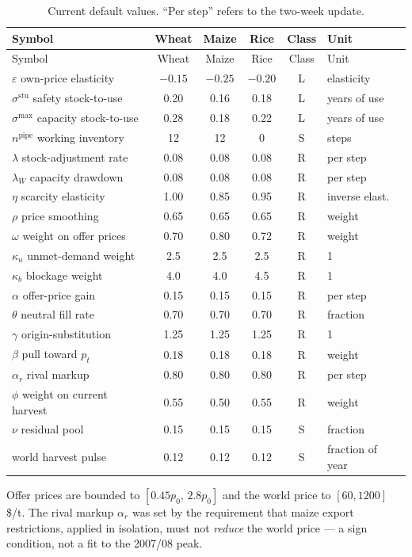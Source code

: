 \begin{longtable}{lccccl}
\caption{Current default values. ``Per step'' refers to the two-week
update.}
\label{tab:params}\\
\toprule
Symbol & Wheat & Maize & Rice & Class & Unit \\
\midrule
\endfirsthead
\toprule
Symbol & Wheat & Maize & Rice & Class & Unit \\
\midrule
\endhead
\(\varepsilon\) own-price elasticity & \(-0.15\) & \(-0.25\) & \(-0.20\) & L & elasticity \\
\(\sigma^{\mathrm{stu}}\) safety stock-to-use & 0.20 & 0.16 & 0.18 & L & years of use \\
\(\sigma^{\max}\) capacity stock-to-use & 0.28 & 0.18 & 0.22 & L & years of use \\
\(n^{\mathrm{pipe}}\) working inventory & 12 & 12 & 0 & S & steps \\
\(\lambda\) stock-adjustment rate & 0.08 & 0.08 & 0.08 & R & per step \\
\(\lambda_W\) capacity drawdown & 0.08 & 0.08 & 0.08 & R & per step \\
\(\eta\) scarcity elasticity & 1.00 & 0.85 & 0.95 & R & inverse elast. \\
\(\rho\) price smoothing & 0.65 & 0.65 & 0.65 & R & weight \\
\(\omega\) weight on offer prices & 0.70 & 0.80 & 0.72 & R & weight \\
\(\kappa_u\) unmet-demand weight & 2.5 & 2.5 & 2.5 & R & 1 \\
\(\kappa_b\) blockage weight & 4.0 & 4.0 & 4.5 & R & 1 \\
\(\alpha\) offer-price gain & 0.15 & 0.15 & 0.15 & R & per step \\
\(\theta\) neutral fill rate & 0.70 & 0.70 & 0.70 & R & fraction \\
\(\gamma\) origin-substitution & 1.25 & 1.25 & 1.25 & R & 1 \\
\(\beta\) pull toward \(p_t\) & 0.18 & 0.18 & 0.18 & R & weight \\
\(\alpha_r\) rival markup & 0.80 & 0.80 & 0.80 & R & per step \\
\(\phi\) weight on current harvest & 0.55 & 0.50 & 0.55 & R & weight \\
\(\nu\) residual pool & 0.15 & 0.15 & 0.15 & S & fraction \\
world harvest pulse & 0.12 & 0.12 & 0.12 & S & fraction of year \\
\bottomrule
\end{longtable}

Offer prices are bounded to \([0.45p_0,\,2.8p_0]\) and the world price to
\([60,1200]\) \$/t. The rival markup \(\alpha_r\) was set by the
requirement that maize export restrictions, applied in isolation, must not
\emph{reduce} the world price --- a sign condition, not a fit to the
2007/08 peak.
